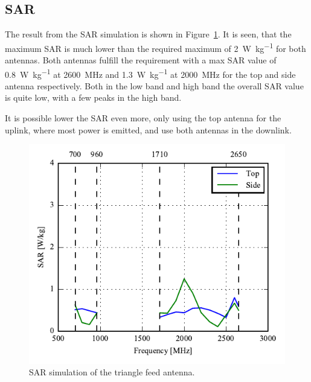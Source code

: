 \FloatBarrier
\subsection{SAR}

The result from the SAR simulation is shown in Figure~\ref{fig:triang_sar_sim}. It is seen, that the maximum SAR is much lower than the required maximum of \SI{2}{W\per kg} for both antennas. Both antennas fulfill the requirement with a max SAR value of \SI{0.8}{W\per kg} at \SI{2600}{MHz} and \SI{1.3}{W\per kg} at \SI{2000}{MHz} for the top and side antenna respectively.   
Both in the low band and high band the overall SAR value is quite low, with a few peaks in the high band.

It is possible lower the SAR even more, only using the top antenna for the uplink, where most power is emitted, and use both antennas in the downlink.

\begin{figure}[htbp]
    \centering
    \includegraphics{img/tech_sol/trianglefeed/sar/sar.pdf}
    \caption{SAR simulation of the triangle feed antenna.}
    \label{fig:triang_sar_sim}
\end{figure}

